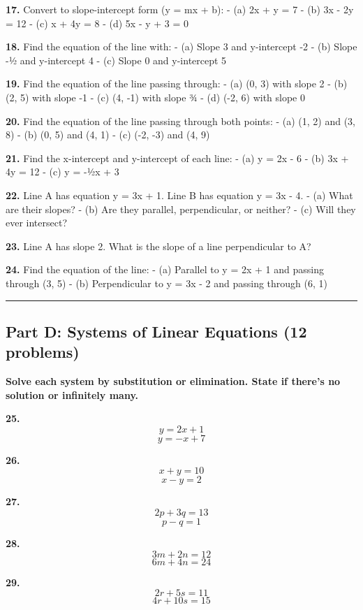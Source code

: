 \documentclass[
  11pt,
]{article}
\begin{document}
\textbf{17.} Convert to slope-intercept form (y = mx + b): - (a) 2x + y
= 7 - (b) 3x - 2y = 12 - (c) x + 4y = 8 - (d) 5x - y + 3 = 0

\textbf{18.} Find the equation of the line with: - (a) Slope 3 and
y-intercept -2 - (b) Slope -½ and y-intercept 4 - (c) Slope 0 and
y-intercept 5

\textbf{19.} Find the equation of the line passing through: - (a) (0, 3)
with slope 2 - (b) (2, 5) with slope -1 - (c) (4, -1) with slope ¾ - (d)
(-2, 6) with slope 0

\textbf{20.} Find the equation of the line passing through both points:
- (a) (1, 2) and (3, 8) - (b) (0, 5) and (4, 1) - (c) (-2, -3) and (4,
9)

\textbf{21.} Find the x-intercept and y-intercept of each line: - (a) y
= 2x - 6 - (b) 3x + 4y = 12 - (c) y = -½x + 3

\textbf{22.} Line A has equation y = 3x + 1. Line B has equation y = 3x
- 4. - (a) What are their slopes? - (b) Are they parallel,
perpendicular, or neither? - (c) Will they ever intersect?

\textbf{23.} Line A has slope 2. What is the slope of a line
perpendicular to A?

\textbf{24.} Find the equation of the line: - (a) Parallel to y = 2x + 1
and passing through (3, 5) - (b) Perpendicular to y = 3x - 2 and passing
through (6, 1)

\begin{center}\rule{0.5\linewidth}{0.5pt}\end{center}

\hypertarget{part-d-systems-of-linear-equations-12-problems}{%
\subsection{Part D: Systems of Linear Equations (12
problems)}\label{part-d-systems-of-linear-equations-12-problems}}

\textbf{Solve each system by substitution or elimination. State if
there's no solution or infinitely many.}

\textbf{25.} \[y = 2x + 1\] \[y = -x + 7\]

\textbf{26.} \[x + y = 10\] \[x - y = 2\]

\textbf{27.} \[2p + 3q = 13\] \[p - q = 1\]

\textbf{28.} \[3m + 2n = 12\] \[6m + 4n = 24\]

\textbf{29.} \[2r + 5s = 11\] \[4r + 10s = 15\]
\end{document}
